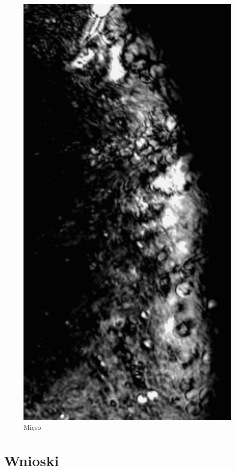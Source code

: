 \documentclass[a4paper,12pt]{article}
\begin{document}
\begin{figure} [H]
  \begin{center}
    \includegraphics[width = 15cm]{data/5MIES4J.png}
    \caption{Mięso}
  \end{center}
\end{figure}



\section{Wnioski}



  
\end{document}
